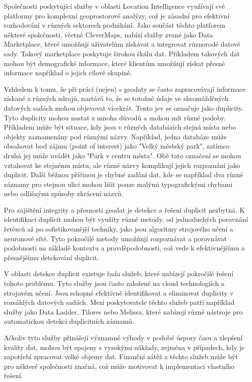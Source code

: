Společnosti poskytující služby v oblasti Location Intelligence využívají své platformy pro komplexní geoprostorové analýzy, což je zásadní pro efektivní rozhodování v různých sektorech podnikání. Jako součást těchto platforem některé společnosti, včetně CleverMaps, nabízí služby zvané jako Data Marketplace, které umožňují uživatelům získávat a integrovat různorodé datové sady. Takový marketplace poskytuje širokou škálu dat. Příkladem takových dat mohou být demografické informace, které klientům umožňují získat přesné informace například o jejich cílové skupině. \cite{clevermaps_location_2024}

Vzhledem k tomu, že při práci (nejen) s geodaty se často zapracovávají informace získané z různých zdrojů, nastává to, že se totožné údaje ve shromážděných datových sadách mohou objevovat vícekrát. Tento jev se označuje jako duplicity. Tyto duplicity mohou nastat z mnoha důvodů a mohou mít různé podoby. Příkladem může být situace, kdy jsou v různých databázích stejná místa nebo objekty zaznamenány pod různými názvy. Například, jedna databáze může obsahovat bod zájmu (point of interest) jako "Velký městský park", zatímco druhá jej může uvádět jako "Park v centru města". Obě tato označení se mohou vztahovat ke stejnému místu, ale různé názvy komplikují jejich rozpoznání jako duplicit. Další běžnou příčinou je chybné zadání dat, kde se například dva různé záznamy pro stejnou ulici mohou lišit pouze malými typografickými chybami nebo odlišnými způsoby zkrácení názvů. \cite{nauman_introduction_2022}

Pro zajištění integrity a přesnosti geodat je detekce a řešení duplicit nezbytná. K identifikaci duplicit mohou být využity různé metody, od jednoduchých porovnání řetězců až po sofistikovanější techniky, jako jsou algoritmy strojového učení a neuronové sítě. Tyto pokročilé metody umožňují rozpoznávat a porovnávat podobnosti na základě kontextu a pravděpodobnosti, což vede k efektivnějšímu a přesnějšímu detekování duplicit. \cite{christen_data_2012}

V oblasti detekce duplicit existuje řada služeb, které nabízejí pokročilé řešení tohoto problému. Tyto služby jsou často založené na cloud technologiích a strojovém učení. Jsou schopné efektivně identifikovat a eliminovat duplicity v rozsáhlých datových sadách. Mezi poskytovatele těchto služeb patří například služby jako Data Ladder, Tilores nebo Melissa, které nabízejí různé nástroje pro automatickou detekci duplicitních záznamů.

Ačkoliv tyto služby přinášejí významné výhody v podobě úspory času a zlepšení kvality dat, mohou být spojeny s vysokými náklady, zejména v případech, kdy je zapotřebí zpracovat velké objemy dat. Finanční zátěž z těchto služeb může být pro některé společnosti značná, což může motivovat k implementaci vlastního řešení.\cite{christen_data_2012}

